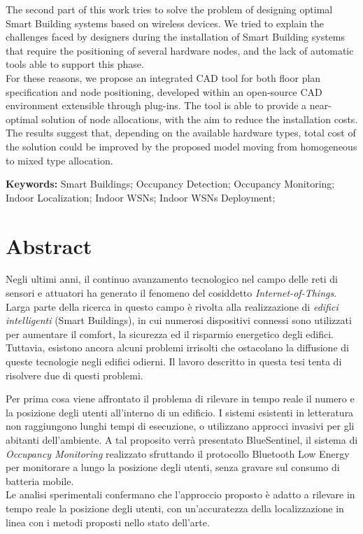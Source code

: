 The second part of this work tries to solve the problem of designing optimal Smart Building systems based on wireless devices. We tried to explain the challenges faced by designers during the installation of Smart Building systems that require the positioning of several hardware nodes, and the lack of automatic tools able to support this phase.\\
For these reasons, we propose an integrated CAD tool for both floor plan specification and node positioning, developed within an \mbox{open-source} CAD environment extensible through plug-ins. The tool is able to provide a near-optimal solution of node allocations, with the aim to reduce the installation costs. The results suggest that, depending on the available hardware types, total cost of the solution could be improved by the proposed model moving from homogeneous to mixed type allocation.

\medskip
%
\noindent \textbf{Keywords:} 
Smart Buildings; Occupancy Detection; Occupancy Monitoring; Indoor Localization; Indoor WSNs; Indoor WSNs Deployment;
%
\clearpage
%
%
%
\cleardoublepage
%
%
\chapter*{Abstract}
%
Negli ultimi anni, il continuo avanzamento tecnologico nel campo delle reti di sensori e attuatori ha generato il fenomeno del cosiddetto \emph{Internet-of-Things}. Larga parte della ricerca in questo campo è rivolta alla realizzazione di \emph{edifici intelligenti} (Smart Buildings), in cui numerosi dispositivi connessi sono utilizzati per aumentare il comfort, la sicurezza ed il risparmio energetico degli edifici. Tuttavia, esistono ancora alcuni problemi irrisolti che ostacolano la diffusione di queste tecnologie negli edifici odierni. Il lavoro descritto in questa tesi tenta di risolvere due di questi problemi.

Per prima cosa viene affrontato il problema di rilevare in tempo reale il numero e la posizione degli utenti all'interno di un edificio. I sistemi esistenti in letteratura non raggiungono lunghi tempi di esecuzione, o utilizzano approcci invasivi per gli abitanti dell'ambiente.
A tal proposito verrà presentato BlueSentinel, il sistema di \emph{Occupancy Monitoring} realizzato sfruttando il protocollo Bluetooth Low Energy per monitorare a lungo la posizione degli utenti, senza gravare sul consumo di batteria mobile.\\
Le analisi sperimentali confermano che l'approccio proposto è adatto a rilevare in tempo reale la posizione degli utenti, con un'accuratezza della localizzazione in linea con i metodi proposti nello stato dell'arte.

